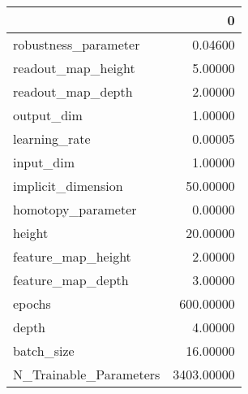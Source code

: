 \begin{tabular}{lr}
\toprule
{} &           0 \\
\midrule
robustness\_parameter   &     0.04600 \\
readout\_map\_height     &     5.00000 \\
readout\_map\_depth      &     2.00000 \\
output\_dim             &     1.00000 \\
learning\_rate          &     0.00005 \\
input\_dim              &     1.00000 \\
implicit\_dimension     &    50.00000 \\
homotopy\_parameter     &     0.00000 \\
height                 &    20.00000 \\
feature\_map\_height     &     2.00000 \\
feature\_map\_depth      &     3.00000 \\
epochs                 &   600.00000 \\
depth                  &     4.00000 \\
batch\_size             &    16.00000 \\
N\_Trainable\_Parameters &  3403.00000 \\
\bottomrule
\end{tabular}
